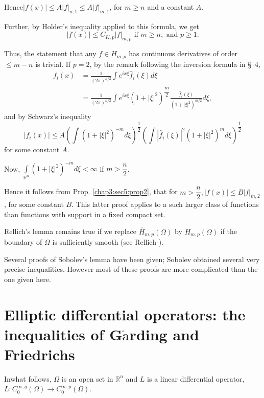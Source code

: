 Hence\pageoriginale $| f(x) | \le A | f|_{n, 1} \le A | f |_{m, 1} $, for $m \ge n$
and a constant $A$. 

Further, by Holder's inequality applied to this formula, we get
$$
| f(x) | \le C_{K, p} | f |_{m, p} \text { if } m \ge n, \text { and } p \ge 1.
$$

Thus, the statement that any $f \in H_{m, p}$ has continuous
derivatives of order $\le m - n$ is trivial. If $ p = 2$, by the
remark following the inversion formula in \S\ 4, 
\begin{align*}
  f_i (x) & = \frac{1}{(2 \pi )^{n / 2}} \int e^{ix \xi} \hat{f}_i (\xi) d \xi\\
  & = \frac{1}{(2 \pi )^{n / 2}} \int e^{ix \xi} (1+ | \xi |^2
  )^{\dfrac{m}{2}} \frac{\hat{f}_i (\xi)}{(1+ | \xi |^2 )^{m/2} } d
  \xi , 
\end{align*}
and by Schwarz's inequality
$$
| f_i (x) | \le A \left( \int (1+ | \xi |^2 )^{-m} d \xi
\right)^{\dfrac{1}{2}} \left (
\int | \hat{f}_i (\xi) |^2 (1+ | \xi |^2)^m d \xi\right)^{\dfrac{1}{2}}  
$$
for some constant $A$.

Now, \quad $\int\limits_{\mathbb{R}^n} (1+ | \xi |^2 )^{-m} d \xi <
\infty$ if $m > \dfrac{n}{2}$. 

Hence it follows from Prop. \ref{chap3:sec5:prop2}, that for $m > \dfrac{n}{2}, | f(x) |
\le B | f |_{m, 2}$, for some constant $B$. This latter proof applies
to a such larger class of functions than functions with support in a
fixed compact set. 

Rellich's lemma remains true if we replace $\overset{\circ}{H}_{m, p}
(\Omega)$ by $H_{m, p} (\Omega)$ if the boundary of $\Omega$ is
sufficiently smooth (see Rellich \cite{37}). 

Several proofs of Sobolev's lemma have been given; Sobolev \cite{42}
obtained several very precise inequalities. However most of these
proofs are more complicated than the one given here. 

\section[Elliptic differential operators:...]{Elliptic differential operators: the inequalities of
  G$\ring{\text{a}}$rding and Friedrichs}\label{chap3:sec6} 

In\pageoriginale what follows, $\Omega$ is an open set in $\mathbb{R}^n$ and $L$ is
a linear differential operator, $L : C^{\infty, q}_0 (\Omega) \to
C^{\infty, p}_0 (\Omega)$. 

